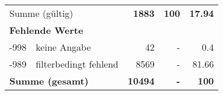 \begin{longtable}{lXrrr}
     \midrule
     \multicolumn{2}{l}{Summe (gültig)} &
       \textbf{\num{1883}} &
     \textbf{100} &
       \textbf{\num[round-mode=places,round-precision=2]{17,94}} \\
     \multicolumn{5}{l}{\textbf{Fehlende Werte}}\\
       -998 &
       keine Angabe &
         \num{42} &
        - &
         \num[round-mode=places,round-precision=2]{0,4} \\
       -989 &
       filterbedingt fehlend &
         \num{8569} &
        - &
         \num[round-mode=places,round-precision=2]{81,66} \\
     \midrule
     \multicolumn{2}{l}{\textbf{Summe (gesamt)}} &
          \textbf{\num{10494}} &
        \textbf{-} &
        \textbf{100} \\
     \bottomrule
     \end{longtable}
     
